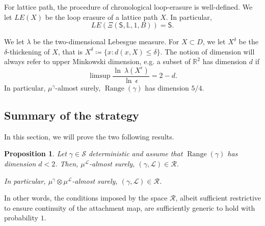 \documentclass[11pt]{article}
\newtheorem{proposition}[theorem]{Proposition}
\DeclareMathOperator{\Range}{Range}
\def\Conf{{\mathscr{R}}}
\def\Att{{\Xi}}
\begin{document}
For lattice path, the procedure of chronological loop-erasure is well-defined. We let $LE(X)$ be the loop erasure of a lattice path $X$. In particular,
\begin{equation}
LE(\Att(\mathsf{S}, \mathbb{L},1,B)  )=\mathsf{S}.
\end{equation}

We let $\lambda$ be the two-dimensional Lebesgue measure. For $X\subset D$, we let $X^\delta$ be the $\delta$-thickening of $X$, that is $X^\delta\coloneqq\{x: d(x,X)\leq \delta\}$. The notion of dimension will always refer to upper Minkowski dimension, e.g. a subset of $\mathbb{R}^ 2$ has dimension $d$ if
\[
\limsup \frac{\ln\ \lambda(X^\epsilon)  }{\ln\ \epsilon }= 2-d.
\]
In particular, $\mu^\gamma$-almost surely, $\Range(\gamma)$ has dimension $5/4$.


\subsection{Summary of the strategy}
In this section, we  will prove the two following results.
\begin{proposition}
\label{prop:conf}
  Let $\gamma\in \mathscr{S}$ deterministic and assume that $\Range(\gamma)$ has dimension $d<2$. Then, $ \mu^{\mathcal{L}}$-almost surely, $(\gamma,\mathcal{L})\in \Conf$.

  In particular, $\mu^\gamma\otimes \mu^{\mathcal{L}}$-almost surely, $(\gamma,\mathcal{L})\in \Conf$.
\end{proposition}
In other words, the conditions imposed by the space $\Conf$, albeit sufficient restrictive to ensure continuity of the attachment map, are sufficiently generic to hold with probability $1$.
\end{document}
